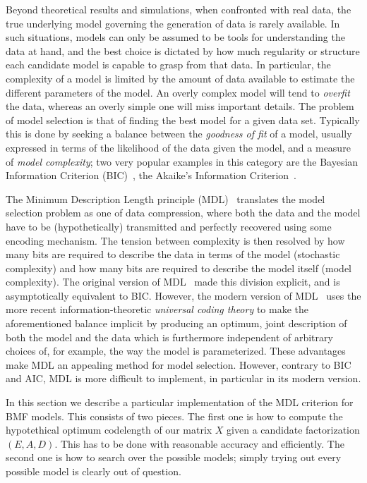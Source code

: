\documentclass[twocolumn]{IEEEtran}
\theoremstyle{definition}
\begin{document}
Beyond theoretical results and simulations, when confronted with real data, 
the true underlying model governing the generation of data is rarely available. In such situations, models can only be assumed to be tools for understanding the data at hand, and the best choice is dictated by how much regularity or structure each candidate model is capable to grasp from that data. In particular, the complexity of a model is limited by the amount of data available to estimate the different parameters of the model. An overly complex model will tend to \emph{overfit} the data, whereas an overly simple one will miss important details. The problem of model selection is that of finding the best model for a given data set. Typically this is done by seeking a balance between the \emph{goodness of fit} of a model, usually expressed in terms of the likelihood of the data given the model, and a measure of \emph{model complexity}; two very popular examples in this category are the Bayesian Information Criterion (BIC)~\cite{bic}, the Akaike's Information Criterion~\cite{aic}. 

The Minimum Description Length principle (MDL)~\cite{mdl1,mdl2,mdl3} translates the model selection problem as one of data compression, where both the data and the model have to be (hypothetically) transmitted and perfectly recovered using some encoding mechanism. The tension between complexity is then resolved by how many bits are required to describe the data in terms of the model (stochastic complexity) and how many bits are required to describe the model itself (model complexity). The original version of MDL~\cite{mdl1} made this division explicit, and is asymptotically equivalent to BIC. However, the modern version of MDL~\cite{mdl2,mdl3} uses the more recent information-theoretic \emph{universal coding theory} to make the aforementioned balance implicit by producing an optimum, joint description of both the model and the data which is furthermore independent of arbitrary choices of, for example, the way the model is parameterized. These advantages make MDL an appealing method for model selection. However, contrary to BIC and AIC, MDL is more difficult to implement, in particular in its modern version. 

In this section we describe a particular implementation of the MDL criterion for BMF models. This consists of two pieces. The first one is how to compute the hypotethical optimum codelength of our matrix $X$ given  a candidate factorization $(E,A,D)$. This has to be done with reasonable accuracy and efficiently. The second one is how to search over the possible models; simply trying out every possible model is clearly out of question.
\end{document}
